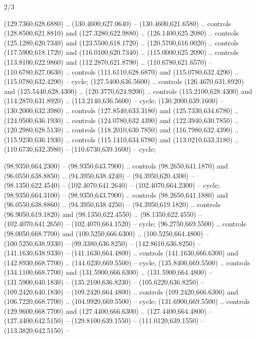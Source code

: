 \begin{flagdescription}{2/3}
\begin{scope} [xshift=0.5\flaglength,yshift=\flagwidth/3.75]
\begin{scope}[y=-\flagwidth/358, x=\flagwidth/346,xshift=-0.565\flagwidth,
   yshift=2.0084\flagwidth]
\begin{scope}[draw=black,fill=white,line width=0.768\lw]
  (129.7360,628.6880) .. (130.4600,627.0640) -- (130.4600,621.6580) .. controls
  (128.8500,621.8810) and (127.3280,622.9880) .. (126.1400,625.2080) .. controls
  (125.1280,620.7340) and (123.5500,618.1720) .. (120.5700,616.0020) .. controls
  (117.5900,618.1720) and (116.0100,620.7340) .. (115.0000,625.2090) .. controls
  (113.8100,622.9860) and (112.2870,621.8790) .. (110.6780,621.6570) --
  (110.6780,627.0630) .. controls (111.6110,628.6870) and (115.0780,632.4290) ..
  (115.0780,632.4290) -- cycle;
 (127.5400,636.5600) .. controls (126.4670,631.8920) and
  (125.5440,628.4300) .. (120.3770,624.9200) .. controls (115.2100,628.4300) and
  (114.2870,631.8920) .. (113.2140,636.5600) -- cycle;
 (130.2000,639.1600) -- (130.2000,632.3980) .. controls
  (127.8540,633.3180) and (125.7330,634.6780) .. (124.9500,636.1930) .. controls
  (124.0780,632.4390) and (122.3940,630.7850) .. (120.2980,628.5130) .. controls
  (118.2010,630.7850) and (116.7980,632.4390) .. (115.9230,636.1930) .. controls
  (115.1410,634.6780) and (113.0210,633.3180) .. (110.6730,632.3980) --
  (110.6730,639.1600) -- cycle;
\begin{scope}[cm={{-1.0,0.0,0.0,1.0,(390.74,0.0)}}]
 (98.9350,664.2300) -- (98.9350,643.7900) .. controls
  (98.2650,641.1870) and (96.0550,638.8850) .. (94.3950,638.4240) --
  (94.3950,620.4300) -- (98.1350,622.4540) -- (102.4070,641.2640) --
  (102.4070,664.2300) -- cycle;
 (98.9350,664.3100) -- (98.9350,643.7900) .. controls
  (98.2650,641.1880) and (96.0550,638.8860) .. (94.3950,638.4250) --
  (94.3950,619.1820) .. controls (96.9050,619.1820) and (98.1350,622.4550) ..
  (98.1350,622.4550) -- (102.4070,641.2650) -- (102.4070,664.1520) -- cycle;
 (96.2750,669.5500) .. controls (98.0050,668.7700) and
  (100.5250,666.6300) .. (100.5250,664.4800) -- (100.5250,638.9330) --
  (99.3380,636.8250) -- (142.8610,636.8250) -- (141.1630,638.9330) --
  (141.1630,664.4800) .. controls (141.1630,666.6300) and (142.8930,668.7700) ..
  (144.6230,669.5500) -- cycle;
 (135.8400,669.5500) .. controls (134.1100,668.7700) and
  (131.5900,666.6300) .. (131.5900,664.4800) -- (131.5900,640.1830) --
  (135.2100,636.8230) -- (105.6220,636.8250) -- (109.2420,640.1830) --
  (109.2420,664.4800) .. controls (109.2420,666.6300) and (106.7220,668.7700) ..
  (104.9920,669.5500) -- cycle;
 (131.6900,669.5500) .. controls (129.9600,668.7700) and
  (127.4400,666.6300) .. (127.4400,664.4800) -- (127.4400,642.5150) --
  (129.8100,639.1550) -- (111.0120,639.1550) -- (113.3820,642.5150) --

\end{scope}
\end{scope}
\end{scope}
\end{scope}
\end{flagdescription}
